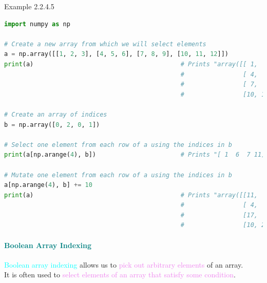 \documentclass{book}
\begin{document}
\begin{egBox}{Example 2.2.4.5}{}
    \begin{lstlisting}[language=Python, basicstyle=\ttfamily\small, keywordstyle=\color{blue}, commentstyle=\color{forestgreen}, stringstyle=\color{red}, showstringspaces=false]
import numpy as np

# Create a new array from which we will select elements
a = np.array([[1, 2, 3], [4, 5, 6], [7, 8, 9], [10, 11, 12]])
print(a)                                        # Prints "array([[ 1,  2,  3],
                                                #                [ 4,  5,  6],
                                                #                [ 7,  8,  9],
                                                #                [10, 11, 12]])"

# Create an array of indices
b = np.array([0, 2, 0, 1])

# Select one element from each row of a using the indices in b
print(a[np.arange(4), b])                       # Prints "[ 1  6  7 11]"

# Mutate one element from each row of a using the indices in b
a[np.arange(4), b] += 10
print(a)                                        # Prints "array([[11,  2,  3],
                                                #                [ 4,  5, 16],
                                                #                [17,  8,  9],
                                                #                [10, 21, 12]])"
    \end{lstlisting}
\end{egBox}
\newpage
\textcolor{teal}{\paragraph{Boolean Array Indexing}}
\textcolor{cyan}{Boolean array indexing} allows us to \textcolor{violet}{pick out arbitrary elements} of an array.\\
It is often used to \textcolor{violet}{select elements of an array that satisfy some condition}.
\end{document}
